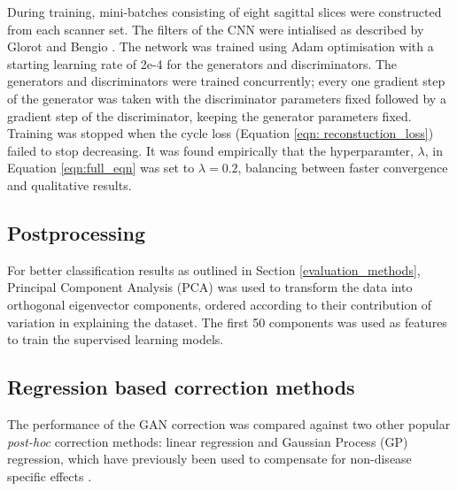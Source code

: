 During training, mini-batches consisting of eight sagittal slices were constructed from each scanner set. The filters of the CNN were intialised as described by Glorot and Bengio \citep{glorot2010understanding}. The network was trained using Adam optimisation \citep{kingma2014adam} with a starting learning rate of 2e-4 for the generators and discriminators. The generators and discriminators were trained concurrently; every one gradient step of the generator was taken with the discriminator parameters fixed followed by a gradient step of the discriminator, keeping the generator parameters fixed. Training was stopped when the cycle loss (Equation \ref{eqn: reconstuction_loss}) failed to stop decreasing. It was found empirically that the hyperparamter, $\lambda$, in Equation \ref{eqn:full_eqn} was set to $\lambda = 0.2$, balancing between faster convergence and qualitative results.

\subsection{Postprocessing}
For better classification results as outlined in Section \ref{evaluation_methods}, Principal Component Analysis (PCA) was used to transform the data into orthogonal eigenvector components, ordered according to their contribution of variation in explaining the dataset. The first 50 components was used as features to train the supervised learning models.

\subsection{Regression based correction methods}
The performance of the GAN correction was compared against two other popular \textit{post-hoc} correction methods: linear regression and Gaussian Process (GP) regression, which have previously been used to compensate for non-disease specific effects \citep{kostro2014correction,rao2017predictive, dukart2011age}.

